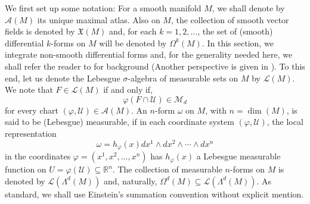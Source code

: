 \documentclass[smallextended]{svjour3}
\theoremstyle{remark}
\begin{document}
\noindent We first set up some notation: For a smooth manifold $M$, we shall denote by $\mathcal{A}(M)$ its unique maximal atlas. Also on $M$, the collection of smooth vector fields is denoted by $\mathfrak{X}(M)$ and, for each $k=1,2,\dots$, the set of (smooth) differential $k$-forms on $M$ will be denoted by $\Omega^k(M)$.  In this section, we integrate non-smooth differential forms and, for the generality needed here, we shall refer the reader to \cite{naber_topology_2011} for background (Another perspective is given in \cite{amann_analysis_2009}). To this end, let us denote the Lebesgue $\sigma$-algebra of measurable sets on $M$ by $\mathcal{L}(M)$. We note that $F\in\mathcal{L}(M)$ if and only if, \begin{equation*}
    \varphi(F\cap \mathcal{U})\in\mathcal{M}_d
\end{equation*}
for every chart $(\varphi,\mathcal{U})\in\mathcal{A}(M)$. An $n$-form $\omega$ on $M$, with $n=\dim(M)$, is said to be (Lebesgue) measurable, if in each coordinate system $(\varphi,\mathcal{U})$, the local representation
\begin{equation*}
    \omega=h_{\varphi}(x)dx^1\wedge dx^2\wedge \cdots\wedge dx^n
\end{equation*}
in the coordinates $\varphi=(x^1,x^2,\dots,x^n)$ has $h_{\varphi}(x)$ a Lebesgue measurable function on $U=\varphi(\mathcal{U})\subseteq\mathbb{R}^n$. The collection of measurable $n$-forms on $M$ is denoted by $\mathcal{L}(\Lambda^d(M))$ and, naturally, $\Omega^{d}(M)\subseteq \mathcal{L}(\Lambda^d(M))$. As standard, we shall use Einstein's summation convention without explicit mention.\\
\end{document}
